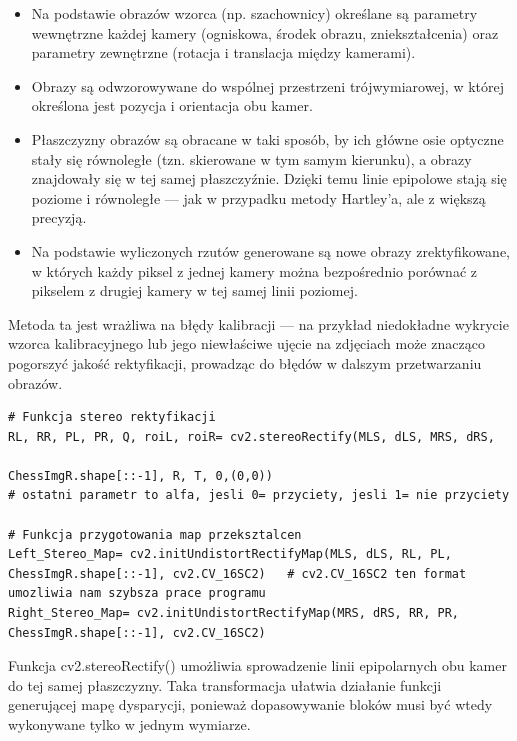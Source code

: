 \documentclass[magisterska]{pracadypl}
\begin{document}
\begin{itemize}
  \item Na podstawie obrazów wzorca (np. szachownicy) określane są parametry wewnętrzne każdej kamery (ogniskowa, środek obrazu, zniekształcenia) oraz parametry zewnętrzne (rotacja i translacja między kamerami).

  \item Obrazy są odwzorowywane do wspólnej przestrzeni trójwymiarowej, w której określona jest pozycja i orientacja obu kamer.


  \item Płaszczyzny obrazów są obracane w taki sposób, by ich główne osie optyczne stały się równoległe (tzn. skierowane w tym samym kierunku), a obrazy znajdowały się w tej samej płaszczyźnie. Dzięki temu linie epipolowe stają się poziome i równoległe — jak w przypadku metody Hartley’a, ale z większą precyzją.


  \item Na podstawie wyliczonych rzutów generowane są nowe obrazy zrektyfikowane, w których każdy piksel z jednej kamery można bezpośrednio porównać z pikselem z drugiej kamery w tej samej linii poziomej.
\end{itemize}

Metoda ta jest wrażliwa na błędy kalibracji — na przykład niedokładne wykrycie wzorca kalibracyjnego lub jego niewłaściwe ujęcie na zdjęciach może znacząco pogorszyć jakość rektyfikacji, prowadząc do błędów w dalszym przetwarzaniu obrazów.


\begin{lstlisting}[style=mypython]
# Funkcja stereo rektyfikacji
RL, RR, PL, PR, Q, roiL, roiR= cv2.stereoRectify(MLS, dLS, MRS, dRS, 
                                                 ChessImgR.shape[::-1], R, T, 0,(0,0))
# ostatni parametr to alfa, jesli 0= przyciety, jesli 1= nie przyciety

# Funkcja przygotowania map przeksztalcen
Left_Stereo_Map= cv2.initUndistortRectifyMap(MLS, dLS, RL, PL, ChessImgR.shape[::-1], cv2.CV_16SC2)   # cv2.CV_16SC2 ten format umozliwia nam szybsza prace programu
Right_Stereo_Map= cv2.initUndistortRectifyMap(MRS, dRS, RR, PR, ChessImgR.shape[::-1], cv2.CV_16SC2)
\end{lstlisting}

Funkcja cv2.stereoRectify() umożliwia sprowadzenie linii epipolarnych obu kamer do tej samej płaszczyzny. Taka transformacja ułatwia działanie funkcji generującej mapę dysparycji, ponieważ dopasowywanie bloków musi być wtedy wykonywane tylko w jednym wymiarze.
\end{document}
